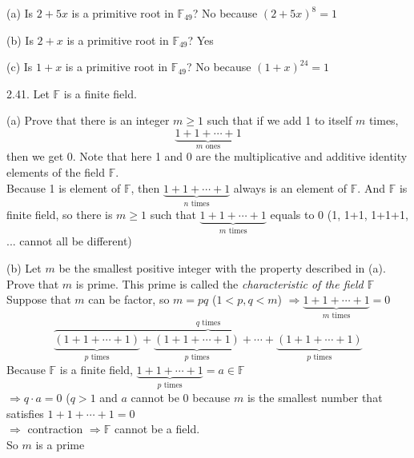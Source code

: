 (a) Is $2+5x$ is a primitive root in $\mathbb{F}_{49}$? No because $(2+5x)^8=1$

(b) Is $2+x$ is a primitive root in $\mathbb{F}_{49}$? Yes

(c) Is $1+x$ is a primitive root in $\mathbb{F}_{49}$? No because $(1+x)^{24} = 1$


2.41. Let $\mathbb{F}$ is a finite field.

(a) Prove that there is an integer $m \geq 1$ such that if we add 1 to itself $m$ times, \[\underbrace{1+1+\cdots+1}_{m \text{ ones}} \] then we get 0. Note that here 1 and 0 are the multiplicative and additive identity elements of the field $\mathbb{F}$. \\ Because 1 is element of $\mathbb{F}$, then $\underbrace{1+1+\cdots+1}_{n \text{ times}}$ always is an element of $\mathbb{F}$. And $\mathbb{F}$ is finite field, so there is $m \geq 1$ such that $\underbrace{1+1+\cdots+1}_{m \text{ times}}$ equals to 0 (1, 1+1, 1+1+1, ... cannot all be different)

(b) Let $m$ be the smallest positive integer with the property described in (a). Prove that $m$ is prime. This prime is called the \textit{characteristic of the field $\mathbb{F}$} \\ Suppose that $m$ can be factor, so $m=pq$ ($1 < p, q < m$) $\Rightarrow \underbrace{1+1+\cdots+1}_{m \text{ times}} = 0$ \[ \overbrace{\underbrace{(1+1+\cdots+1)}_{p \text{ times}} + \underbrace{(1+1+\cdots+1)}_{p \text{ times}} + \cdots + \underbrace{(1+1+\cdots+1)}_{p \text{ times}}}^{q \text{ times}}\] Because $\mathbb{F}$ is a finite field, $\underbrace{1+1+\cdots+1}_{p \text{ times}} = a \in \mathbb{F}$ \\ $\Rightarrow q \cdot a = 0$ ($q > 1$ and $a$ cannot be 0 because $m$ is the smallest number that satisfies $1+1+\cdots+1=0$ \\ $\Rightarrow$ contraction $\Rightarrow \mathbb{F}$ cannot be a field. \\ So $m$ is a prime 


